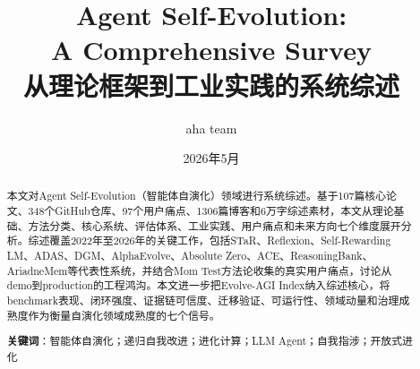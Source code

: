 \documentclass[11pt,a4paper]{article}
\title{\textbf{Agent Self-Evolution: \\ A Comprehensive Survey}\\[6pt]
\large 从理论框架到工业实践的系统综述}
\author{aha team}
\date{2026年5月}
\begin{document}
\maketitle

\begin{abstract}
本文对Agent Self-Evolution（智能体自演化）领域进行系统综述。基于107篇核心论文、348个GitHub仓库、97个用户痛点、1306篇博客和6万字综述素材，本文从理论基础、方法分类、核心系统、评估体系、工业实践、用户痛点和未来方向七个维度展开分析。综述覆盖2022年至2026年的关键工作，包括STaR、Reflexion、Self-Rewarding LM、ADAS、DGM、AlphaEvolve、Absolute Zero、ACE、ReasoningBank、AriadneMem等代表性系统，并结合Mom Test方法论收集的真实用户痛点，讨论从demo到production的工程鸿沟。本文进一步把Evolve-AGI Index纳入综述核心，将benchmark表现、闭环强度、证据链可信度、迁移验证、可运行性、领域动量和治理成熟度作为衡量自演化领域成熟度的七个信号。

\textbf{关键词}：智能体自演化；递归自我改进；进化计算；LLM Agent；自我指涉；开放式进化
\end{abstract}

\tableofcontents
\newpage














\end{document}
